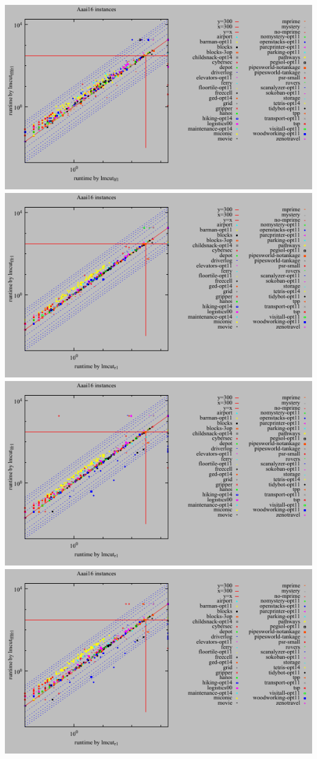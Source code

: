 \includegraphics{tables/aaai16-time-lmcut_lf-lmcut_fflfr.pdf}
\linebreak
\includegraphics{tables/aaai16-time-lmcut_r-lmcut_ffr.pdf}
\linebreak
\includegraphics{tables/aaai16-time-lmcut_r-lmcut_lfr.pdf}
\linebreak
\includegraphics{tables/aaai16-time-lmcut_r-lmcut_fflfr.pdf}
\linebreak
